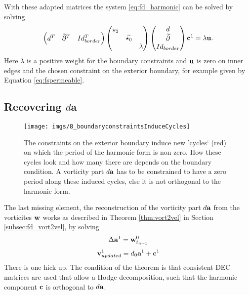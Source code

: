 With these adapted matrices the system \ref{eq:fd_harmonic} can be solved by solving
\begin{equation}\begin{pmatrix} d^T & \widetilde{\partial}^T & Id_{border}^T \end{pmatrix} \begin{pmatrix}
\star_2 & & \\
 & \widetilde{\star_0} & \\
 & & \lambda
\end{pmatrix} \begin{pmatrix} d \\
\widetilde{\partial}\\
Id_{border}
\end{pmatrix} \textbf{c}^1= \lambda\textbf{u}.\label{eq:fsharmonic}\end{equation}
Here $\lambda$ is a positive weight for the boundary constraints and $\textbf{u}$ is zero on inner edges and the chosen constraint on the exterior boundary, for example given by Equation \ref{eq:fspermeable}. 

\subsection{Recovering $d\textbf{a}$}
\label{ssec:fd_recovering_da}

\begin{figure}%
\begin{center}
\texttt{[image: imgs/8\_boundaryconstraintsInduceCycles]}%
\end{center}
\caption{The constraints on the exterior boundary induce new 'cycles` (red) on which the period of the harmonic form is non zero. How these cycles look and how many there are depends on the boundary condition. A vorticity part $d\textbf{a}$ has to be constrained to have a zero period along these induced cycles, else it is not orthogonal to the harmonic form.}%
\label{fig:fd_boundaryinducedCycles}%
\end{figure}

The last missing element, the reconstruction of the vorticity part $d\textbf{a}$ from the vorticites $\textbf{w}$ works as described in Theorem \ref{thm:vort2vel} in Section \ref{subsec:fd_vort2vel}, by solving 
\begin{equation}\Delta \textbf{a}^1 = \textbf{w}^0_{t_{n+1}}\label{eq:fd_discreteVort2Vel}\end{equation}
\begin{equation}\textbf{v}^1_{updated} =  d_0 \textbf{a}^1 + \textbf{c}^1\end{equation}
There is one hick up. The condition of the theorem is that consistent DEC matrices are used that allow a Hodge decomposition, such that the harmonic component $\textbf{c}$ is orthogonal to $d\textbf{a}$. 

